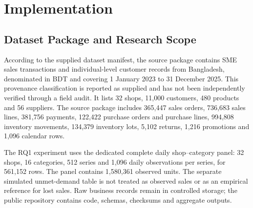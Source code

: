 \documentclass[a4paper,11pt,oneside]{book}
\theoremstyle{plain}
\theoremstyle{definition}
\theoremstyle{remark}
\begin{document}
\clearpage

\chapter{Implementation}
\label{chapter_implementation}

\section{Dataset Package and Research Scope}

According to the supplied dataset manifest, the source package contains
SME sales transactions and individual-level customer records from Bangladesh,
denominated in BDT and covering 1 January 2023 to 31 December 2025. This
provenance classification is reported as supplied and has not been independently
verified through a field audit. It lists 32 shops, 11,000
customers, 480 products and 56 suppliers. The source package includes
365,447 sales orders, 736,683 sales lines, 381,756 payments, 122,422 purchase
orders and purchase lines, 994,808 inventory movements, 134,379 inventory
lots, 5,102 returns, 1,216 promotions and 1,096 calendar rows.

The RQ1 experiment uses the dedicated complete daily shop--category panel:
32 shops, 16 categories, 512 series and 1,096 daily observations per series,
for 561,152 rows. The panel contains 1,580,361 observed units. The separate
simulated unmet-demand table is not treated as observed sales or as an
empirical reference for lost sales. Raw business records remain in controlled storage;
the public repository contains code, schemas, checksums and aggregate outputs.
\end{document}
